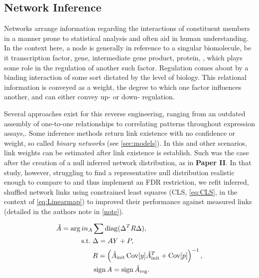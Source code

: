 \subsection{Network Inference}
\label{sec:netinf}
Networks arrange information regarding the interactions of constituent members in a manner prone to statistical analysis and often aid in human understanding. In the context here, a node is generally in reference to a singular biomolecule, be it transcription factor, gene, intermediate gene product, protein, \etc, which plays some role in the regulation of another such factor. Regulation comes about by a binding interaction of some sort dictated by the level of biology. This relational information is conveyed as a weight, the degree to which one factor influences another, and can either convey up- or down- regulation.

Several approaches exist for this reverse engineering, ranging from an outdated assembly of one-to-one relationships to correlating patterns throughout expression assays,\etc. Some inference methods return link existence with no confidence or weight, so called \emph{binary networks} (see \cref{sec:models}). In this and other scenarios, link weights can be estimated after link existence is establish. Such was the case after the creation of a null inferred network distribution, as in \textbf{Paper II}. In that study, however, struggling to find a representative null distribution realistic enough to compare to and thus implement an FDR restriction, we refit inferred, shuffled network links using constrained least squares (CLS, \cref{eq:CLS}, \cite{grant2008cvx} in the context of \cref{eq:Linearmap}) to improved their performance against measured links (detailed in the authors note in \cref{note}). 


\begin{equation}%
\begin{aligned}\label{eq:CLS}
  \hat{A} = \arg in_{A} & \sum \diag(\Delta^TR \Delta), \\
  \text{s.t.}\; & \Delta = A Y + P, \\
  & R = \left( \hat{A}_{\textrm{init}} \Cov[y] \hat{A}_{\textrm{init}}^{T} + \Cov[p]\right)^{-1},\\ %
  & \sign{A} = \sign{\hat{A}_{\textrm{reg}}}. \\
\end{aligned}
\end{equation}

